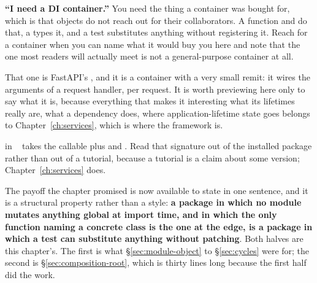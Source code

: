 \begin{trapbox}
\textbf{\enquote{I need a DI container.}} You need the thing a container
was bought for, which is that objects do not reach out for their
collaborators. A function and  do that, a
 types it, and a test substitutes anything without
registering it. Reach for a container when you can name what it would buy
you here \dash{} and note that the one most readers will actually meet is
not a general-purpose container at all.
\end{trapbox}

\noindent
That one is FastAPI's , and it is a container with a very
small remit: it wires the arguments of a request handler, per request. It is
worth previewing here only to say what it is, because everything that makes
it interesting \dash{} what its lifetimes really are, what a 
dependency does, where application-lifetime state goes \dash{} belongs to
Chapter~\ref{ch:services}, which is where the framework is.

\begin{versionbox}
 in ~\fastapiver{} takes the callable plus
 and . Read that signature out of the installed
package rather than out of a tutorial, because a tutorial is a claim about
some version; Chapter~\ref{ch:services} does.
\end{versionbox}

\noindent
The payoff the chapter promised is now available to state in one sentence,
and it is a structural property rather than a style: \textbf{a package in
which no module mutates anything global at import time, and in which the
only function naming a concrete class is the one at the edge, is a package
in which a test can substitute anything without patching}. Both halves are
this chapter's. The first is what \S\ref{sec:module-object} to
\S\ref{sec:cycles} were for; the second is \S\ref{sec:composition-root},
which is thirty lines long because the first half did the work.

